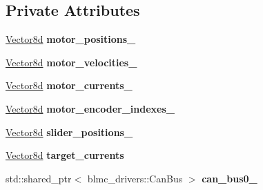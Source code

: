 \subsection*{Private Attributes}
\begin{DoxyCompactItemize}
\item 
\mbox{\label{classblmc__robots_1_1TestBench8Motors_ac32c6d0f719d3c625c40a63f1eefc449}} 
\hyperlink{common__header_8hpp_a98975ffbe0bca1296078e0350dfedd60}{Vector8d} {\bfseries motor\+\_\+positions\+\_\+}
\item 
\mbox{\label{classblmc__robots_1_1TestBench8Motors_a594bd5780d360e70e17e37756d0f537e}} 
\hyperlink{common__header_8hpp_a98975ffbe0bca1296078e0350dfedd60}{Vector8d} {\bfseries motor\+\_\+velocities\+\_\+}
\item 
\mbox{\label{classblmc__robots_1_1TestBench8Motors_ac361dfc4c7af6920b13e224a141829e4}} 
\hyperlink{common__header_8hpp_a98975ffbe0bca1296078e0350dfedd60}{Vector8d} {\bfseries motor\+\_\+currents\+\_\+}
\item 
\mbox{\label{classblmc__robots_1_1TestBench8Motors_a8d4a175fb4f3f3c909938fd2d2da68f3}} 
\hyperlink{common__header_8hpp_a98975ffbe0bca1296078e0350dfedd60}{Vector8d} {\bfseries motor\+\_\+encoder\+\_\+indexes\+\_\+}
\item 
\mbox{\label{classblmc__robots_1_1TestBench8Motors_a72f68c2eca0d4753145aba745d1d099e}} 
\hyperlink{common__header_8hpp_a98975ffbe0bca1296078e0350dfedd60}{Vector8d} {\bfseries slider\+\_\+positions\+\_\+}
\item 
\mbox{\label{classblmc__robots_1_1TestBench8Motors_ae84b85450353d1ce04fb35e24359276a}} 
\hyperlink{common__header_8hpp_a98975ffbe0bca1296078e0350dfedd60}{Vector8d} {\bfseries target\+\_\+currents}
\item 
\mbox{\label{classblmc__robots_1_1TestBench8Motors_a0c50382c9a1a27f421bf67d867261478}} 
std\+::shared\+\_\+ptr$<$ blmc\+\_\+drivers\+::\+Can\+Bus $>$ {\bfseries can\+\_\+bus0\+\_\+}
\item 

\end{DoxyCompactItemize}
